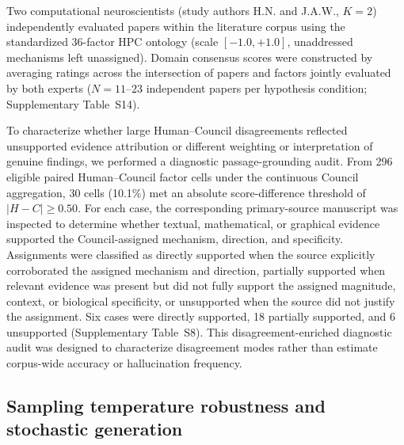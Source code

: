 \documentclass[12pt]{article}
\begin{document}
Two computational neuroscientists (study authors H.N. and J.A.W., $K=2$) independently evaluated papers within the literature corpus using the standardized 36-factor HPC ontology (scale $[-1.0, +1.0]$, unaddressed mechanisms left unassigned). Domain consensus scores were constructed by averaging ratings across the intersection of papers and factors jointly evaluated by both experts ($N=11\text{--}23$ independent papers per hypothesis condition; Supplementary Table~S14). 

To characterize whether large Human--Council disagreements reflected unsupported evidence attribution or different weighting or interpretation of genuine findings, we performed a diagnostic passage-grounding audit. From 296 eligible paired Human--Council factor cells under the continuous Council aggregation, 30 cells (10.1\%) met an absolute score-difference threshold of $|H-C| \ge 0.50$. For each case, the corresponding primary-source manuscript was inspected to determine whether textual, mathematical, or graphical evidence supported the Council-assigned mechanism, direction, and specificity. Assignments were classified as directly supported when the source explicitly corroborated the assigned mechanism and direction, partially supported when relevant evidence was present but did not fully support the assigned magnitude, context, or biological specificity, or unsupported when the source did not justify the assignment. Six cases were directly supported, 18 partially supported, and 6 unsupported (Supplementary Table~S8). This disagreement-enriched diagnostic audit was designed to characterize disagreement modes rather than estimate corpus-wide accuracy or hallucination frequency.

\subsection{Sampling temperature robustness and stochastic generation}\label{temperature-robustness-methods}
\end{document}
